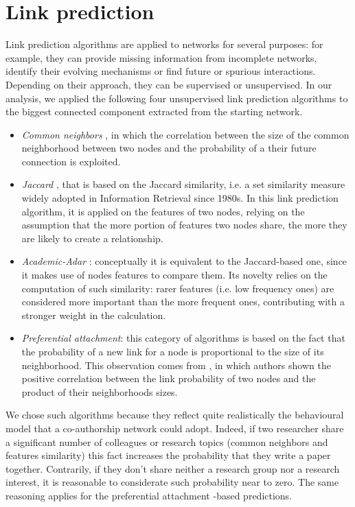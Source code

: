 \documentclass[sigchi]{acmart}
\begin{document}
\section{Link prediction} \label{sec:linkPrediction}
Link prediction algorithms are applied to networks for several purposes: for example, they can provide missing information from incomplete networks, identify their evolving mechanisms or find future or spurious interactions. Depending on their approach, they can be supervised or unsupervised. In our analysis, we applied the following four unsupervised link prediction algorithms to the biggest connected component extracted from the starting network.
\begin{itemize}
    \item \textit{Common neighbors} \cite{commonNeighbors}, in which the correlation between the size of the common neighborhood between two nodes and the probability of a their future connection is exploited.
    \item \textit{Jaccard} \cite{Jaccard}, that is based on the Jaccard similarity, i.e. a set similarity measure widely adopted in Information Retrieval since 1980s. In this link prediction algorithm, it is applied on the features of two nodes, relying on the assumption that the more portion of features two nodes share, the more they are likely to create a relationship.
    \item \textit{Academic-Adar} \cite{AdamicAdar}: conceptually it is equivalent to the Jaccard-based one, since it makes use of nodes features to compare them. Its novelty relies on the computation of such similarity: rarer features (i.e. low frequency ones) are considered more important than the more frequent ones, contributing with a stronger weight in the calculation.
    \item \textit{Preferential attachment}: this category of algorithms is based on the fact that the probability of a new link for a node is proportional to the size of its neighborhood. This observation comes from \cite{BARABASI2002590}, in which authors shown the positive correlation between the link probability of two nodes and the product of their neighborhoods sizes.
\end{itemize}
We chose such algorithms because they reflect quite realistically the behavioural model that a co-authorship network could adopt. Indeed, if two researcher share a significant number of colleagues or research topics (common neighbors and features similarity) this fact increases the probability that they write a paper together. Contrarily, if they don't share neither a research group nor a research interest, it is reasonable to considerate such probability near to zero. The same reasoning applies for the preferential attachment -based predictions. \\
\end{document}
